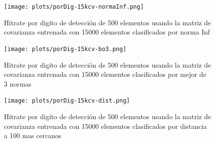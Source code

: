 \begin{figure}[H]
\begin {center}
\texttt{[image: plots/porDig-15kcv-normaInf.png]}
\end {center}
\caption{Hitrate por digito de detecci\'on de 500 elementos usando la matriz de covarianza entrenada con 15000 elementos
clasificados por norma Inf}
\label{fig:HRD15kcv-ninf}
\end{figure}

\begin{figure}[H]
\begin {center}
\texttt{[image: plots/porDig-15kcv-bo3.png]}
\end {center}
\caption{Hitrate por digito de detecci\'on de 500 elementos usando la matriz de covarianza entrenada con 15000 elementos
clasificados por mejor de 3 normas}
\label{fig:HRD15kcv-bo3}
\end{figure}

\begin{figure}[H]
\begin {center}
\texttt{[image: plots/porDig-15kcv-dist.png]}
\end {center}
\caption{Hitrate por digito de detecci\'on de 500 elementos usando la matriz de covarianza entrenada con 15000 elementos
clasificados por distancia a 100 mas cercanos}
\label{fig:HRD15kcv-dist100}
\end{figure}